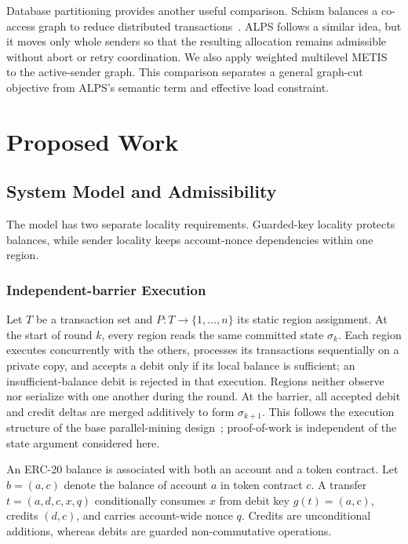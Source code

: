 \documentclass[conference,letterpaper]{IEEEtran}
\begin{document}
Database partitioning provides another useful comparison. Schism balances a
co-access graph to reduce distributed transactions~\cite{curino2010}. ALPS
follows a similar idea, but it moves only whole senders so that the resulting
allocation remains admissible without abort or retry coordination. We also
apply weighted multilevel METIS~\cite{karypis1998metis} to the active-sender
graph. This comparison separates a general graph-cut objective from ALPS's
semantic term and effective load constraint.

\section{Proposed Work}
\label{sec:methodology}

\subsection{System Model and Admissibility}
\label{sec:model}

The model has two separate locality requirements. Guarded-key locality
protects balances, while sender locality keeps account-nonce dependencies within
one region.

\subsubsection{Independent-barrier Execution}

Let $T$ be a transaction set and
$P:T\rightarrow\{1,\ldots,n\}$ its static region assignment. At the start of
round $k$, every region reads the same committed state $\sigma_k$. Each region
executes concurrently with the others, processes its transactions sequentially
on a private copy, and accepts a debit only if its local balance is sufficient;
an insufficient-balance debit is rejected in that execution. Regions neither
observe nor serialize with one another during the round. At the barrier, all
accepted debit and credit deltas are merged additively to form $\sigma_{k+1}$.
This follows the execution structure of the base
parallel-mining design~\cite{chishti2021}; proof-of-work is independent of the
state argument considered here.

An ERC-20 balance is associated with both an account and a token contract. Let
$b=(a,c)$ denote the balance of account $a$ in token contract $c$. A transfer
$t=(a,d,c,x,q)$ conditionally consumes $x$ from debit key
$g(t)=(a,c)$, credits $(d,c)$, and carries account-wide nonce $q$. Credits are
unconditional additions, whereas debits are guarded non-commutative
operations.
\end{document}
